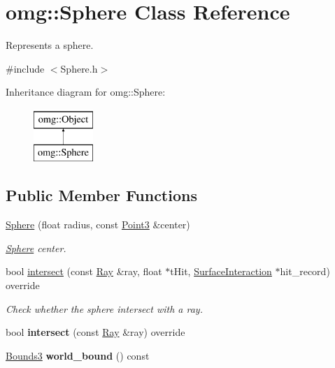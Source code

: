 \hypertarget{classomg_1_1_sphere}{}\section{omg\+::Sphere Class Reference}
\label{classomg_1_1_sphere}


Represents a sphere.  




{\ttfamily \#include $<$Sphere.\+h$>$}

Inheritance diagram for omg\+::Sphere\+:\begin{figure}[H]
\begin{center}
\leavevmode
\includegraphics[height=2.000000cm]{classomg_1_1_sphere}
\end{center}
\end{figure}
\subsection*{Public Member Functions}
\begin{DoxyCompactItemize}
\item 
\mbox{\hyperlink{classomg_1_1_sphere_a81f9a5180b9c883ce00669d4af4d38db}{Sphere}} (float radius, const \mbox{\hyperlink{namespaceomg_af85242d35fdacf829d32a6f9b95f3e35}{Point3}} \&center)
\begin{DoxyCompactList}\small\item\em \mbox{\hyperlink{classomg_1_1_sphere}{Sphere}} center. \end{DoxyCompactList}\item 
\mbox{\label{classomg_1_1_sphere_ad05c4f0083c55288119c0d1f7dc7f300}} 
bool \mbox{\hyperlink{classomg_1_1_sphere_ad05c4f0083c55288119c0d1f7dc7f300}{intersect}} (const \mbox{\hyperlink{classomg_1_1_ray}{Ray}} \&ray, float $\ast$t\+Hit, \mbox{\hyperlink{classomg_1_1_surface_interaction}{Surface\+Interaction}} $\ast$hit\+\_\+record) override
\begin{DoxyCompactList}\small\item\em Check whether the sphere intersect with a ray. \end{DoxyCompactList}\item 
\mbox{\label{classomg_1_1_sphere_a4e7eb85961d4b2d0f384ea51144cbb95}} 
bool {\bfseries intersect} (const \mbox{\hyperlink{classomg_1_1_ray}{Ray}} \&ray) override
\item 
\mbox{\label{classomg_1_1_sphere_a5d0a05e361f98cad7e0d83da4ebc0849}} 
\mbox{\hyperlink{classomg_1_1_bounds3}{Bounds3}} {\bfseries world\+\_\+bound} () const
\end{DoxyCompactItemize}


